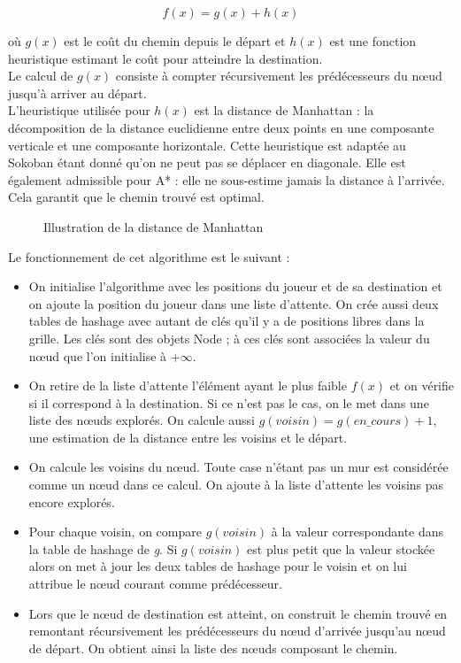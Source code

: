 \documentclass[a4paper,12pt]{article} %
\begin{document}
$$ f(x) = g(x) + h(x)$$

où $g(x)$ est le coût du chemin depuis le départ et $h(x)$ est une fonction heuristique estimant le coût pour atteindre la destination.\\

Le calcul de $g(x)$ consiste à compter récursivement les prédécesseurs du nœud jusqu'à arriver au départ.\\
L'heuristique utilisée pour $h(x)$ est la distance de Manhattan : la décomposition de la distance euclidienne entre deux points en une composante verticale et une composante horizontale. Cette heuristique est adaptée au Sokoban étant donné qu'on ne peut pas se déplacer en diagonale. Elle est également admissible pour A* : elle ne sous-estime jamais la distance à l'arrivée. Cela garantit que le chemin trouvé est optimal.

\begin{figure}[!h]
\centering
{}
\caption{Illustration de la distance de Manhattan}
\end{figure}

Le fonctionnement de cet algorithme est le suivant :\\

\begin{itemize}
\item On initialise l'algorithme avec les positions du joueur et de sa destination et on ajoute la position du joueur dans une liste d'attente. On crée aussi deux tables de hashage avec autant de clés qu'il y a de positions libres dans la grille. Les clés sont des objets Node ; à ces clés sont associées la valeur du nœud que l'on initialise à +$\infty$.
\item On retire de la liste d'attente l'élément ayant le plus faible $f(x)$ et on vérifie si il correspond à la destination. Si ce n'est pas le cas, on le met dans une liste des nœuds explorés. On calcule aussi $g(voisin)=g(en\_cours)+1$, une estimation de la distance entre les voisins et le départ.
\item On calcule les voisins du nœud. Toute case n'étant pas un mur est considérée comme un nœud dans ce calcul. On ajoute à la liste d'attente les voisins pas encore explorés.
\item Pour chaque voisin, on compare $g(voisin)$ à la valeur correspondante dans la table de hashage de \textit{g}. Si $g(voisin)$ est plus petit que la valeur stockée alors on met à jour les deux tables de hashage pour le voisin et on lui attribue le nœud courant comme prédécesseur.
\item Lors que le nœud de destination est atteint, on construit le chemin trouvé en remontant récursivement les prédécesseurs du nœud d'arrivée jusqu'au nœud de départ. On obtient ainsi la liste des nœuds composant le chemin.
\end{itemize}
\end{document}
